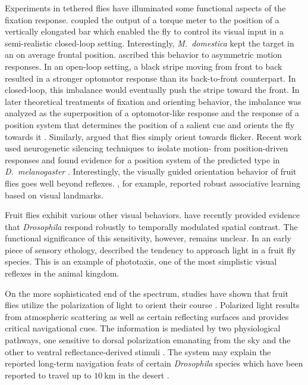 Experiments in tethered flies have illuminated some functional aspects of the fixation response. \citet{Reichardt:1969aa} coupled the output of a torque meter to the position of a vertically elongated bar which enabled the fly to control its visual input in a semi-realistic closed-loop setting. Interestingly, \textit{M.\ domestica} kept the target in an on average frontal position. \citet{Reichardt:1973aa} ascribed this behavior to asymmetric motion responses. In an open-loop setting, a black stripe moving from front to back resulted in a stronger optomotor response than its back-to-front counterpart. In closed-loop, this imbalance would eventually push the stripe toward the front. In later theoretical treatments of fixation and orienting behavior, the imbalance was analyzed as the superposition of a optomotor-like response and the response of a position system that determines the position of a salient cue and orients the fly towards it \citep{Poggio:1973aa}. Similarly, \citet{Pick:1974aa} argued that flies simply orient towards flicker. Recent work used neurogenetic silencing techniques to isolate motion- from position-driven responses and found evidence for a position system of the predicted type in \textit{D.\ melanogaster} \citep{Bahl:2013ha}. Interestingly, the visually guided orientation behavior of fruit flies goes well beyond reflexes. \citet{Ofstad:2011aa}, for example, reported robust associative learning based on visual landmarks.

Fruit flies exhibit various other visual behaviors. \citet{Bahl:2015cqa} have recently provided evidence that \textit{Drosophila} respond robustly to temporally modulated spatial contrast. The functional significance of this sensitivity, however, remains unclear. In an early piece of sensory ethology, \citet{Carpenter:1905aa} described the tendency to approach light in a fruit fly species. This is an example of phototaxis, one of the most simplistic visual reflexes in the animal kingdom.

On the more sophisticated end of the spectrum, studies have shown that fruit flies utilize the polarization of light to orient their course \citep{Weir:2012aa}. Polarized light results from atmospheric scattering as well as certain reflecting surfaces and provides critical navigational cues. The information is mediated by two physiological pathways, one sensitive to dorsal polarization emanating from the sky and the other to ventral reflectance-derived stimuli \citep{Wernet:2012aa}. The system may explain the reported long-term navigation feats of certain \textit{Drosophila} species which have been reported to travel up to $\SI{10}{\kilo\metre}$ in the desert \citep{Dickinson:2014aa}.


